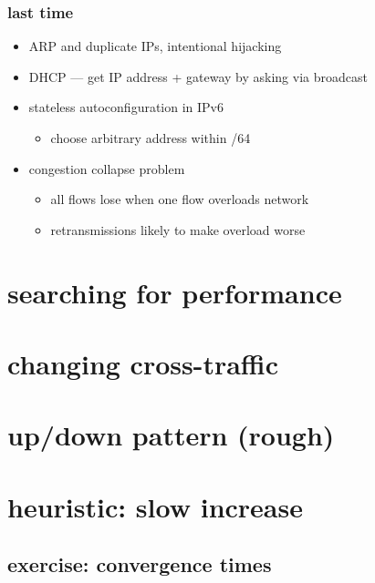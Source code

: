 \date{}
\title{}
\date{}

\begin{frame}
    \titlepage
\end{frame}



\begin{frame}
\frametitle{last time}
\begin{itemize}
\item ARP and duplicate IPs, intentional hijacking
\item DHCP --- get IP address + gateway by asking via broadcast
\item stateless autoconfiguration in IPv6
    \begin{itemize}
        \item choose arbitrary address within /64
    \end{itemize}
\item congestion collapse problem
    \begin{itemize}
    \item all flows lose when one flow overloads network
    \item retransmissions likely to make overload worse
    \end{itemize}
\end{itemize}
\end{frame}

\section{searching for performance}


\section{changing cross-traffic}


\section{up/down pattern (rough)}


\section{heuristic: slow increase}


\subsection{exercise: convergence times}


